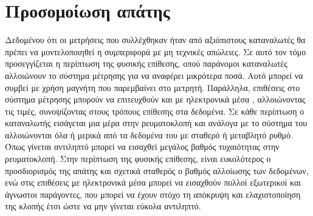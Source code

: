 \section{Προσομοίωση απάτης}
Δεδομένου ότι οι μετρήσεις που συλλέχθηκαν ήταν από αξιόπιστους καταναλωτές θα πρέπει να μοντελοποιηθεί η συμπεριφορά με μη τεχνικές απώλειες. Σε αυτό τον τόμο προσεγγίζεται η περίπτωση της φυσικής επίθεσης, οπού παράνομοι καταναλωτές αλλοιώνουν το σύστημα μέτρησης για να αναφέρει μικρότερα ποσά. Αυτό μπορεί να συμβεί με χρήση μαγνήτη που παρεμβαίνει στο μετρητή. Παράλληλα, επιθέσεις στο σύστημα μέτρησης μπορούν να επιτευχθούν και με ηλεκτρονικά μέσα , αλλοιώνοντας τις τιμές, συνοψίζοντας στους τρόπους επίθεσης στα δεδομένα. Σε κάθε περίπτωση ο καταναλωτής εισάγεται μια μέρα στην ρευματοκλοπή και ανάλογα με το σύστημα του αλλοιώνονται όλα ή μερικά από τα δεδομένα του με σταθερό ή μεταβλητό ρυθμό. Όπως γίνεται αντιληπτό μπορεί να εισαχθεί μεγάλος βαθμός τυχαιότητας στην ρευματοκλοπή. Στην περίπτωση της φυσικής επίθεσης, είναι ευκολότερος ο προσδιορισμός της απάτης και σχετικά σταθερός ο βαθμός αλλοίωσης των δεδομένων, ενώ στις επιθέσεις με ηλεκτρονικά μέσα μπορεί να εισαχθούν πολλοί εξωτερικοί και άγνωστοι παράγοντες, που μπορεί να έχουν στόχο τη απόκρυψη και ελαχιστοποίηση της κλοπής έτσι ώστε να μην γίνεται εύκολα αντιληπτό.
